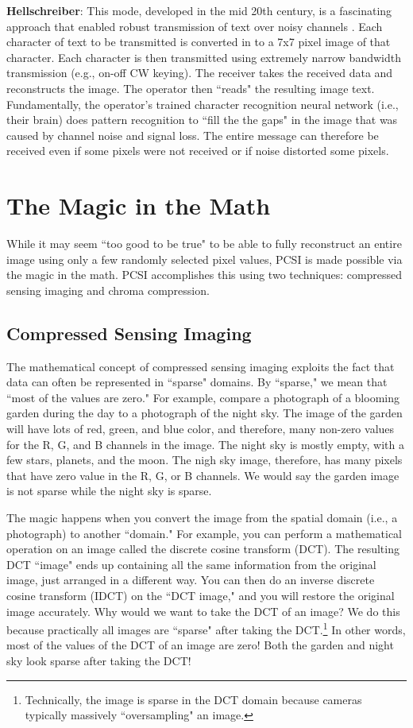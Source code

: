 \documentclass[letterpaper]{article}
\begin{document}
\textbf{Hellschreiber}: This mode, developed in the mid 20th century, is a fascinating approach that enabled robust transmission of text over noisy channels \cite{hells}. Each character of text to be transmitted is converted in to a 7x7 pixel image of that character. Each character is then transmitted using extremely narrow bandwidth transmission (e.g., on-off CW keying). The receiver takes the received data and reconstructs the image. The operator then ``reads" the resulting image text. Fundamentally, the operator's trained character recognition neural network (i.e., their brain) does pattern recognition to ``fill the the gaps" in the image that was caused by channel noise and signal loss. The entire message can therefore be received even if some pixels were not received or if noise distorted some pixels.

\section{The Magic in the Math}
While it may seem ``too good to be true" to be able to fully reconstruct an entire image using only a few randomly selected pixel values, PCSI is made possible via the magic in the math. PCSI accomplishes this using two techniques: compressed sensing imaging and chroma compression.

\subsection{Compressed Sensing Imaging}
The mathematical concept of compressed sensing imaging exploits the fact that data can often be represented in ``sparse" domains. By ``sparse," we mean that ``most of the values are zero." For example, compare a photograph of a blooming garden during the day to a photograph of the night sky. The image of the garden will have lots of red, green, and blue color, and therefore, many non-zero values for the R, G, and B channels in the image. The night sky is mostly empty, with a few stars, planets, and the moon. The nigh sky image, therefore, has many pixels that have zero value in the R, G, or B channels. We would say the garden image is not sparse while the night sky is sparse.

The magic happens when you convert the image from the spatial domain (i.e., a photograph) to another ``domain." For example, you can perform a mathematical operation on an image called the discrete cosine transform (DCT). The resulting DCT ``image" ends up containing all the same information from the original image, just arranged in a different way. You can then do an inverse discrete cosine transform (IDCT) on the ``DCT image," and you will restore the original image accurately. Why would we want to take the DCT of an image? We do this because practically all images are ``sparse" after taking the DCT.\footnote{Technically, the image is sparse in the DCT domain because cameras typically massively ``oversampling" an image.} In other words, most of the values of the DCT of an image are zero! Both the garden and night sky look sparse after taking the DCT!
\end{document}
